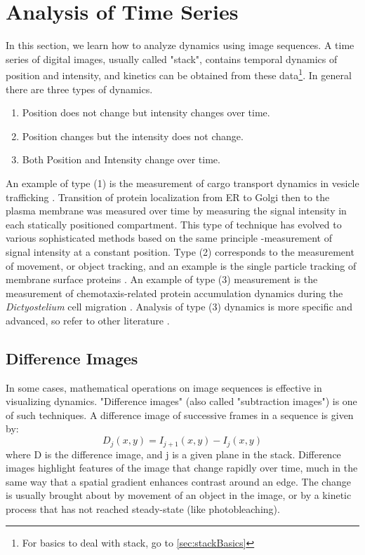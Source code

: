 
\section{Analysis of Time Series }
\label{sec:timeseries}

In this section, we learn how to analyze dynamics using image sequences.
A time series of digital images, usually called
"stack", contains temporal dynamics of
position and intensity, and kinetics can be obtained from these data\footnote{For basics to deal with stack, go to \ref{sec:stackBasics}}.
In general there are three types of dynamics.

\begin{enumerate}
\item Position does not change but intensity changes over time. 
\item Position changes but the intensity does not change. 
\item Both Position and Intensity change over time. 
\end{enumerate}

An example of type (1) is the measurement of cargo transport dynamics in
vesicle trafficking \citep{hirschbergJCB1998}. Transition of protein
localization from ER to Golgi then to the plasma membrane was measured
over time by measuring the signal intensity in each statically
positioned compartment. This type of technique has evolved to various
sophisticated methods based on the same principle -measurement of
signal intensity at a constant position. Type (2) corresponds to the
measurement of movement, or object tracking, and an example is the
single particle tracking of membrane surface proteins \citep{muraseBJ2004}. An example of type (3) measurement is the measurement of
chemotaxis-related protein accumulation dynamics during the
\textit{Dictyostelium} cell migration \citep{Dormann2002}. Analysis
of type (3) dynamics is more specific and advanced, so refer to other
literature \citep{miuraABEB2005}.


\subsection{Difference Images}

In some cases, mathematical operations on image sequences is effective in
visualizing dynamics. "Difference images" (also called "subtraction images") is
one of such techniques.
A difference image of successive frames in a sequence is given by:
\begin{equation}
D_{j}(x,y)=I_{j+1}(x,y) - I_{j}(x,y)
\end{equation}
where D is the difference image, and j is a given plane in the stack.
Difference images highlight features of the image that change rapidly
over time, much in the same way that a spatial gradient enhances
contrast around an edge. The change is usually brought about by
movement of an object in the image, or by a kinetic process that has
not reached steady-state (like photobleaching).

